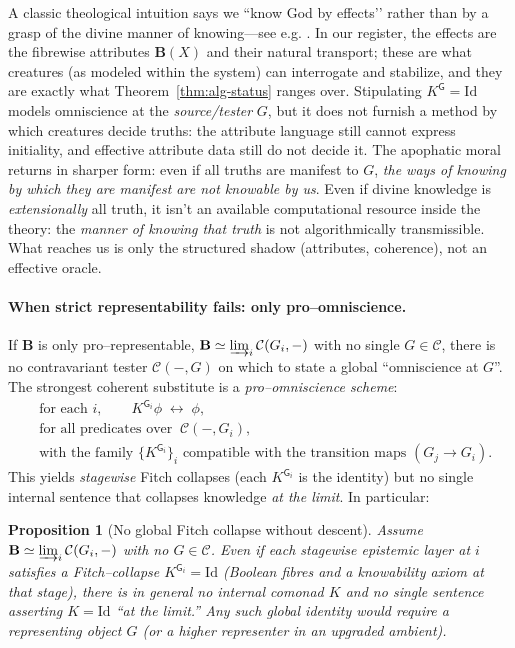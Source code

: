 \documentclass[11pt]{article}
\theoremstyle{upright}
\newtheorem{proposition}{Proposition}
\begin{document}
\medskip
\begin{infobox}[title={Theological vignette: knowing by effects}]
A classic theological intuition says we “know God by effects’’ rather than by a grasp of the divine manner of knowing---see e.g. \citep{Aquinas1920, AquinasSCG}. In our register, the effects are the fibrewise attributes $\mathbf B(X)$ and their natural transport; these are what creatures (as modeled within the system) can interrogate and stabilize, and they are exactly what Theorem~\ref{thm:alg-status} ranges over. Stipulating $K^{\mathsf G}=\mathrm{Id}$ models omniscience at the \emph{source/tester} $G$, but it does not furnish a method by which creatures decide truths: the attribute language still cannot express initiality, and effective attribute data still do not decide it. The apophatic moral returns in sharper form: even if all truths are manifest to $G$, \emph{the ways of knowing by which they are manifest are not knowable by us}. Even if divine knowledge is \emph{extensionally} all truth, it isn't an available computational resource inside the theory: the \emph{manner of knowing that truth} is not algorithmically transmissible. What reaches us is only the structured shadow (attributes, coherence), not an effective oracle.
\end{infobox}

\paragraph{When strict representability fails: only pro–omniscience.}
If $\mathbf B$ is only pro–representable, $\mathbf B\simeq \varinjlim_i \mathcal C(G_i,-)$ with no single $G\in\mathcal C$, there is no contravariant tester $\mathcal C(-,G)$ on which to state a global “omniscience at $G$”. The strongest coherent substitute is a \emph{pro–omniscience scheme}:
\[
\begin{aligned}
&\text{for each } i,\qquad K^{\mathsf G_i}\phi \;\leftrightarrow\; \phi,\\[2pt]
&\text{for all predicates over }\ \mathcal C(-,G_i),\\[2pt]
&\text{with the family } \{K^{\mathsf G_i}\}_i \text{ compatible with the transition maps } (G_j \to G_i).
\end{aligned}
\]
This yields \emph{stagewise} Fitch collapses (each $K^{\mathsf G_i}$ is the identity) but no single internal sentence that collapses knowledge \emph{at the limit}. In particular:

\begin{proposition}[No global Fitch collapse without descent]
Assume $\mathbf B\simeq \varinjlim_i \mathcal C(G_i,-)$ with no $G\in\mathcal C$. Even if each \emph{stagewise} epistemic layer at $i$ satisfies a Fitch–collapse $K^{\mathsf G_i}=\mathrm{Id}$ (Boolean fibres and a knowability axiom at that stage), there is in general no internal comonad $K$ and no single sentence asserting $K=\mathrm{Id}$ “at the limit.” Any such global identity would require a representing object $G$ (or a higher representer in an upgraded ambient). 
\end{proposition}
\end{document}
